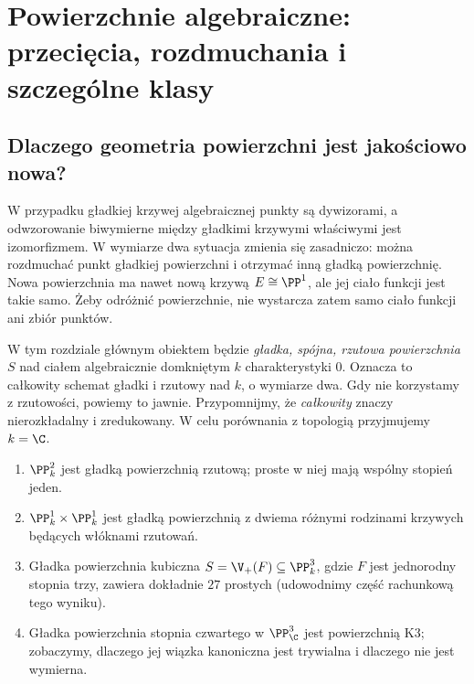 \chapter{Powierzchnie algebraiczne: przecięcia, rozdmuchania i szczególne klasy}
\label{ch:ga6-powierzchnie}

\section{Dlaczego geometria powierzchni jest jakościowo nowa?}
\label{sec:ga6-motywacja}

W przypadku gładkiej krzywej algebraicznej punkty są dywizorami,
a odwzorowanie biwymierne między gładkimi krzywymi właściwymi jest
izomorfizmem. W wymiarze dwa sytuacja zmienia się zasadniczo:
można rozdmuchać punkt gładkiej powierzchni i otrzymać inną gładką
powierzchnię. Nowa powierzchnia ma nawet nową krzywą $E\cong\PP^1$,
ale jej ciało funkcji jest takie samo. Żeby odróżnić powierzchnie,
nie wystarcza zatem samo ciało funkcji ani zbiór punktów.

W tym rozdziale głównym obiektem będzie \emph{gładka, spójna,
rzutowa powierzchnia} $S$ nad ciałem algebraicznie domkniętym
$k$ charakterystyki $0$. Oznacza to całkowity schemat gładki i
rzutowy nad $k$, o wymiarze dwa. Gdy nie korzystamy z rzutowości,
powiemy to jawnie. Przypomnijmy, że \emph{całkowity} znaczy
nierozkładalny i zredukowany. W celu porównania z topologią
przyjmujemy $k=\C$.

\begin{przyklad}
\label{prz:ga6-examples}
\begin{enumerate}[label=(\roman*)]
\item $\PP^2_k$ jest gładką powierzchnią rzutową; proste w niej
      mają wspólny stopień jeden.
\item $\PP^1_k\times\PP^1_k$ jest gładką powierzchnią z dwiema
      różnymi rodzinami krzywych będących włóknami rzutowań.
\item Gładka powierzchnia kubiczna $S=\V_+(F)\subseteq\PP^3_k$,
      gdzie $F$ jest jednorodny stopnia trzy, zawiera dokładnie
      $27$ prostych (udowodnimy część rachunkową tego wyniku).
\item Gładka powierzchnia stopnia czwartego w $\PP^3_\C$
      jest powierzchnią K3; zobaczymy, dlaczego jej wiązka
      kanoniczna jest trywialna i dlaczego nie jest wymierna.
\end{enumerate}
\end{przyklad}

